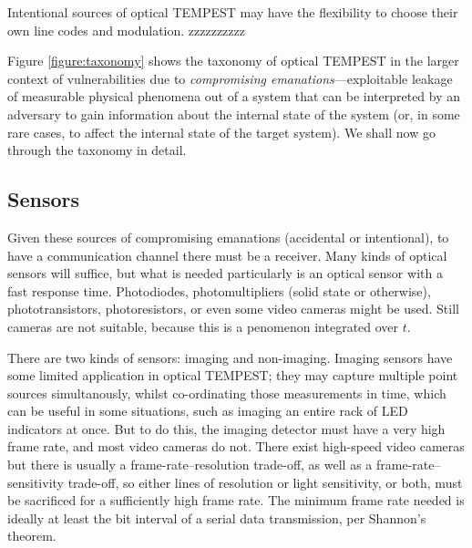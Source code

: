 \documentclass[a4paper,twoside,11pt]{book}
\begin{document}
Intentional sources of optical TEMPEST may have the flexibility to choose their
own line codes and modulation. zzzzzzzzzz

Figure \ref{figure:taxonomy} shows the taxonomy of optical TEMPEST in the
larger context of vulnerabilities due to \emph{compromising
emanations}---exploitable leakage of measurable physical phenomena out of a
system that can be interpreted by an adversary to gain information about the
internal state of the system (or, in some rare cases, to affect the internal
state of the target system). We shall now go through the taxonomy in detail.

\subsection{Sensors}
Given these sources of compromising emanations (accidental or intentional), to
have a communication channel there must be a receiver. Many kinds of optical
sensors will suffice, but what is needed particularly is an optical sensor with
a fast response time. Photodiodes, photomultipliers (solid state or otherwise),
phototransistors, photoresistors, or even some video cameras might be used.
Still cameras are not suitable, because this is a penomenon integrated over
$t$.

There are two kinds of sensors: imaging and non-imaging. Imaging sensors have
some limited application in optical TEMPEST; they may capture multiple point
sources simultanously, whilst co-ordinating those measurements in time, which
can be useful in some situations, such as imaging an entire rack of LED
indicators at once. But to do this, the imaging detector must have a very high
frame rate, and most video cameras do not. There exist high-speed video cameras
but there is usually a frame-rate--resolution trade-off, as well as a
frame-rate--sensitivity trade-off, so either lines of resolution or light
sensitivity, or both, must be sacrificed for a sufficiently high frame rate.
The minimum frame rate needed is ideally at least the bit interval of a serial
data transmission, per Shannon's theorem.
\end{document}

